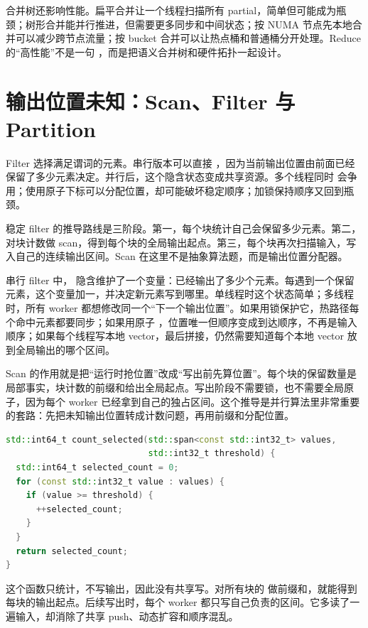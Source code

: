 合并树还影响性能。扁平合并让一个线程扫描所有 partial，简单但可能成为瓶颈；树形合并能并行推进，但需要更多同步和中间状态；按 NUMA 节点先本地合并可以减少跨节点流量；按 bucket 合并可以让热点桶和普通桶分开处理。Reduce 的“高性能”不是一句 ，而是把语义合并树和硬件拓扑一起设计。

\section{输出位置未知：Scan、Filter 与 Partition}

Filter 选择满足谓词的元素。串行版本可以直接 ，因为当前输出位置由前面已经保留了多少元素决定。并行后，这个隐含状态变成共享资源。多个线程同时  会争用；使用原子下标可以分配位置，却可能破坏稳定顺序；加锁保持顺序又回到瓶颈。

稳定 filter 的推导路线是三阶段。第一，每个块统计自己会保留多少元素。第二，对块计数做 scan，得到每个块的全局输出起点。第三，每个块再次扫描输入，写入自己的连续输出区间。Scan 在这里不是抽象算法题，而是输出位置分配器。

串行 filter 中， 隐含维护了一个变量：已经输出了多少个元素。每遇到一个保留元素，这个变量加一，并决定新元素写到哪里。单线程时这个状态简单；多线程时，所有 worker 都想修改同一个“下一个输出位置”。如果用锁保护它，热路径每个命中元素都要同步；如果用原子 ，位置唯一但顺序变成到达顺序，不再是输入顺序；如果每个线程写本地 vector，最后拼接，仍然需要知道每个本地 vector 放到全局输出的哪个区间。

Scan 的作用就是把“运行时抢位置”改成“写出前先算位置”。每个块的保留数量是局部事实，块计数的前缀和给出全局起点。写出阶段不需要锁，也不需要全局原子，因为每个 worker 已经拿到自己的独占区间。这个推导是并行算法里非常重要的套路：先把未知输出位置转成计数问题，再用前缀和分配位置。

\begin{lstlisting}[language=C++,caption={过滤前先统计每个块的输出数量}]
std::int64_t count_selected(std::span<const std::int32_t> values,
                            std::int32_t threshold) {
  std::int64_t selected_count = 0;
  for (const std::int32_t value : values) {
    if (value >= threshold) {
      ++selected_count;
    }
  }
  return selected_count;
}
\end{lstlisting}

这个函数只统计，不写输出，因此没有共享写。对所有块的  做前缀和，就能得到每块的输出起点。后续写出时，每个 worker 都只写自己负责的区间。它多读了一遍输入，却消除了共享 push、动态扩容和顺序混乱。

